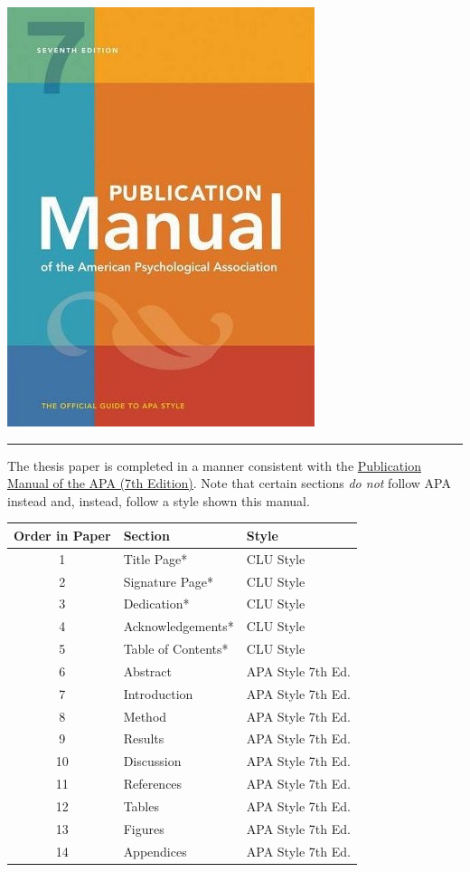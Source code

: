 \documentclass[
  openany]{book}
\begin{document}
\includegraphics{images/apamanual.png}

\begin{center}\rule{0.5\linewidth}{0.5pt}\end{center}

The thesis paper is completed in a manner consistent with the \href{https://www.amazon.com/s?k=apa+publication+manual+7th+edition\&crid=7T10VJ2PYQZH\&sprefix=apa+pu\%2Caps\%2C261\&ref=nb_sb_ss_i_1_6}{Publication Manual of the APA (7th Edition)}. Note that certain sections \emph{do not} follow APA instead and, instead, follow a style shown this manual.

\begin{longtable}[]{@{}cll@{}}
\toprule
Order in Paper & Section & Style\tabularnewline
\midrule
\endhead
1 & Title Page* & CLU Style\tabularnewline
2 & Signature Page* & CLU Style\tabularnewline
3 & Dedication* & CLU Style\tabularnewline
4 & Acknowledgements* & CLU Style\tabularnewline
5 & Table of Contents* & CLU Style\tabularnewline
6 & Abstract & APA Style 7th Ed.\tabularnewline
7 & Introduction & APA Style 7th Ed.\tabularnewline
8 & Method & APA Style 7th Ed.\tabularnewline
9 & Results & APA Style 7th Ed.\tabularnewline
10 & Discussion & APA Style 7th Ed.\tabularnewline
11 & References & APA Style 7th Ed.\tabularnewline
12 & Tables & APA Style 7th Ed.\tabularnewline
13 & Figures & APA Style 7th Ed.\tabularnewline
14 & Appendices & APA Style 7th Ed.\tabularnewline
\bottomrule
\end{longtable}
\end{document}
